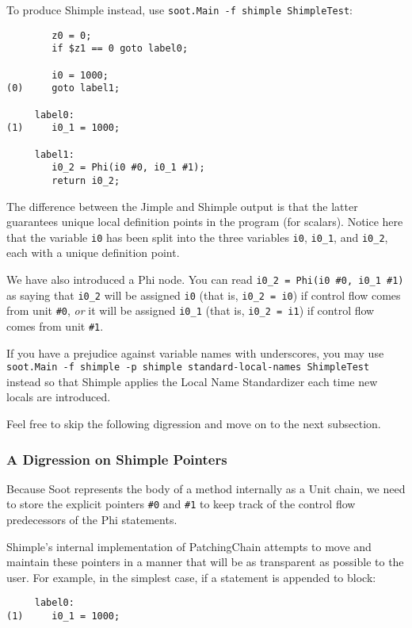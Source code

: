 \documentclass[10pt,letterpaper,oneside,onecolumn]{article}
\begin{document}
To produce Shimple instead, use {\tt soot.Main -f shimple ShimpleTest}:

\begin{verbatim}
        z0 = 0;
        if $z1 == 0 goto label0;

        i0 = 1000;
(0)     goto label1;

     label0:
(1)     i0_1 = 1000;

     label1:
        i0_2 = Phi(i0 #0, i0_1 #1);
        return i0_2;
\end{verbatim}

The difference between the Jimple and Shimple output is that the
latter guarantees unique local definition points in the program (for
scalars).  Notice here that the variable {\tt i0} has been split into
the three variables {\tt i0}, {\tt i0\_1}, and {\tt i0\_2}, each with a
unique definition point.

We have also introduced a Phi node.  You can read {\tt i0\_2 = Phi(i0
\#0, i0\_1 \#1)} as saying that {\tt i0\_2} will be assigned {\tt i0}
(that is, {\tt i0\_2 = i0}) if control flow comes from unit {\tt \#0},
{\em or} it will be assigned {\tt i0\_1} (that is, {\tt i0\_2 = i1})
if control flow comes from unit {\tt \#1}.

If you have a prejudice against variable names with underscores, you
may use {\tt soot.Main -f shimple -p shimple standard-local-names
ShimpleTest} instead so that Shimple applies the Local Name
Standardizer each time new locals are introduced.

Feel free to skip the following digression and move on to the next
subsection.

\subsubsection{A Digression on Shimple Pointers}

Because Soot represents the body of a method internally as a Unit
chain, we need to store the explicit pointers {\tt \#0} and {\tt \#1} to
keep track of the control flow predecessors of the Phi statements.

Shimple's internal implementation of PatchingChain attempts to move
and maintain these pointers in a manner that will be as transparent as
possible to the user.  For example, in the simplest case, if a
statement is appended to block:

\begin{verbatim}
     label0:
(1)     i0_1 = 1000;
\end{verbatim}
\end{document}
